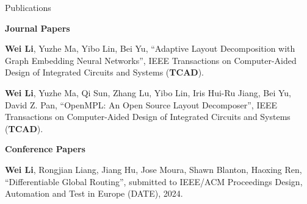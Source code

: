 \newpage
\begin{rSection}{Publications}


    \textbf{Journal Papers}
    \begin{description}[font=\normalfont]
        \item[{[J2]}]{
            \textbf{Wei Li}, Yuzhe Ma, Yibo Lin, Bei Yu, 
            ``Adaptive Layout Decomposition with Graph Embedding Neural Networks'', IEEE Transactions on Computer-Aided Design of Integrated Circuits and Systems (\textbf{TCAD}).
        }
        \item[{[J1]}]{
            \textbf{Wei Li}, Yuzhe Ma, Qi Sun, Zhang Lu, Yibo Lin, Iris Hui-Ru Jiang, Bei Yu, David Z. Pan,
            ``OpenMPL: An Open Source Layout Decomposer'', IEEE Transactions on Computer-Aided Design of Integrated Circuits and Systems (\textbf{TCAD}).
        }
    \end{description}
\textbf{Conference Papers}
\begin{description}[font=\normalfont]
    \item[{[C13]}]{
        \textbf{Wei Li}, Rongjian Liang, Jiang Hu, Jose Moura, Shawn Blanton, Haoxing Ren,
        ``Differentiable Global Routing'', submitted to IEEE/ACM Proceedings Design, Automation and Test in Europe (DATE), 2024. 
    }


\end{description}
\end{rSection}
